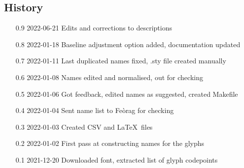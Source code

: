 \documentclass{article}
\begin{document}
\begin{center}
\begin{minipage}{.75\textwidth}
\subsection*{History}
\begin{itemize}[nosep]
  \item[0.9] 2022-06-21 Edits and corrections to descriptions
  \item[0.8] 2022-01-18 Baseline adjustment option added,
    documentation updated
  \item[0.7] 2022-01-11 Last duplicated names fixed, .sty file created
    manually
  \item[0.6] 2022-01-08 Names edited and normalised, out for checking
  \item[0.5] 2022-01-06 Got feedback, edited names as suggested,
    created Makefile
  \item[0.4] 2022-01-04 Sent name list to Feòrag for checking
  \item[0.3] 2022-01-03 Created CSV and \LaTeX\ files
  \item[0.2] 2022-01-02 First pass at constructing names for the
    glyphs
  \item[0.1] 2021-12-20 Downloaded font, extracted list of glyph
    codepoints
\end{itemize}
\end{minipage}
\end{center}
\clearpage
\end{document}
